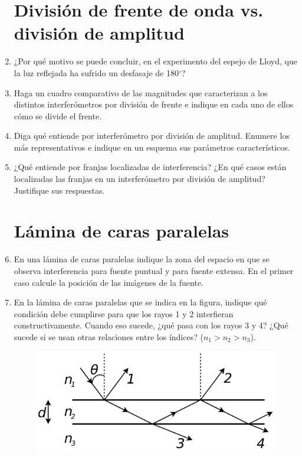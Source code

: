 \documentclass[11pt,spanish,a4paper]{article}
\begin{document}
\begin{enumerate}
\section*{División de frente de onda vs. división de amplitud}

\item ¿Por qué motivo se puede concluir, en el experimento del espejo de
Lloyd, que la luz reflejada ha sufrido un desfasaje de 180$^{\circ}$?


\item Haga un cuadro comparativo de las magnitudes que caracterizan a los
distintos interferómetros por división de frente e indique en cada
uno de ellos cómo se divide el frente. 


\item Diga qué entiende por interferómetro por división de amplitud. Enumere
los más representativos e indique en un esquema sus parámetros característicos. 


\item ¿Qué entiende por franjas localizadas de interferencia? ¿En qué casos
están localizadas las franjas en un interferómetro por división de
amplitud? Justifique sus respuestas. 



\section*{Lámina de caras paralelas}

\item En una lámina de caras paralelas indique la zona del espacio en que
se observa interferencia para fuente puntual y para fuente extensa.
En el primer caso calcule la posición de las imágenes de la fuente. 


\item En la lámina de caras paralelas que se indica en la figura, indique
qué condición debe cumplirse para que los rayos 1 y 2 interfieran
constructivamente. Cuando eso sucede, ¿qué pasa con los rayos 3 y
4? ¿Qué sucede si se usan otras relaciones entre los índices? ($n_{1}>n_{2}>n_{3}$).
\begin{figure}[H]
\centering{}\includegraphics[clip,scale=0.3]{ej5-21}
\end{figure}



\end{enumerate}
\end{document}
